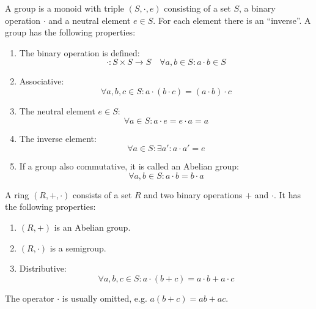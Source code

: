 \begin{definition}[Group]
    A group is a monoid with triple $(S, \cdot, e)$ consisting of a set $S$, 
    a binary operation $\cdot$ and a neutral element $e \in S$.
    For each element there is an ``inverse''.
    A group has the following properties:
    \begin{enumerate}
        \item The binary operation is defined:
            \begin{equation}
                \cdot: S \times S \rightarrow S \quad \forall a,b \in S: a \cdot b \in S
            \end{equation}
        \item Associative:
            \begin{equation}
                \forall a,b,c \in S: a \cdot (b \cdot c) = (a \cdot b) \cdot c
            \end{equation} 
        \item The neutral element $e \in S$:
            \begin{equation}
                \forall a \in S: a \cdot e = e \cdot a = a
            \end{equation}
        \item The inverse element:
            \begin{equation}
                \forall a \in S: \exists a': a \cdot a' = e
            \end{equation}
        \item If a group also commutative, it is called an Abelian group:
        \begin{equation}
            \forall a,b \in S: a \cdot b = b \cdot a
        \end{equation}
    \end{enumerate}
\end{definition}

\begin{definition}[Ring]
    A ring $(R,+,\cdot )$ consists of a set $R$ and two binary operations $+$ and $\cdot$.
    It has the following properties:
    \begin{enumerate}
        \item $(R,+)$ is an Abelian group.
        \item $(R,\cdot)$ is a semigroup.
        \item Distributive:
            \begin{equation}
                \forall a,b,c \in S: a \cdot (b + c) = a \cdot b + a \cdot c
            \end{equation}
    \end{enumerate}
    The operator $\cdot$ is usually omitted, e.g. $a (b + c) = ab + ac$.
\end{definition}

